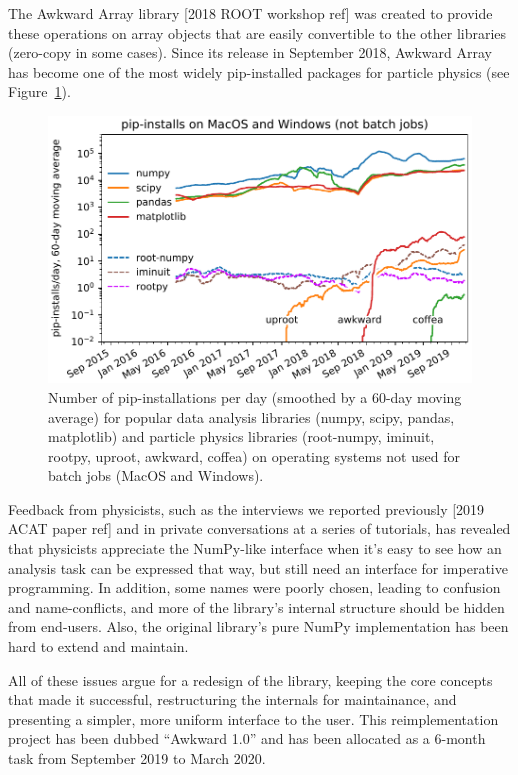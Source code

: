 \documentclass{webofc}
\begin{document}
The Awkward Array library [2018 ROOT workshop ref] was created to provide these operations on array objects that are easily convertible to the other libraries (zero-copy in some cases). Since its release in September 2018, Awkward Array has become one of the most widely pip-installed packages for particle physics (see Figure~\ref{fig:pip-timeline}).

\begin{figure}
\begin{center}
\includegraphics[width=0.75\linewidth]{pip-timeline.pdf}
\end{center}

\vspace{-0.25 cm}
\caption{Number of pip-installations per day (smoothed by a 60-day moving average) for popular data analysis libraries (numpy, scipy, pandas, matplotlib) and particle physics libraries (root-numpy, iminuit, rootpy, uproot, awkward, coffea) on operating systems not used for batch jobs (MacOS and Windows). \label{fig:pip-timeline}}
\end{figure}

Feedback from physicists, such as the interviews we reported previously [2019 ACAT paper ref] and in private conversations at a series of tutorials, has revealed that physicists appreciate the NumPy-like interface when it's easy to see how an analysis task can be expressed that way, but still need an interface for imperative programming. In addition, some names were poorly chosen, leading to confusion and name-conflicts, and more of the library's internal structure should be hidden from end-users. Also, the original library's pure NumPy implementation has been hard to extend and maintain.

All of these issues argue for a redesign of the library, keeping the core concepts that made it successful, restructuring the internals for maintainance, and presenting a simpler, more uniform interface to the user. This reimplementation project has been dubbed ``Awkward 1.0'' and has been allocated as a 6-month task from September 2019 to March 2020.
\end{document}
